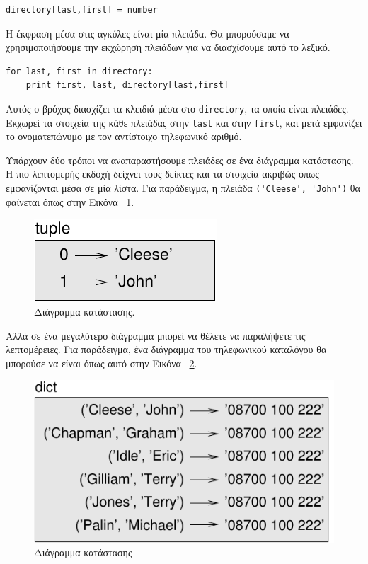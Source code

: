 \documentclass[10pt]{book}
\begin{document}
\begin{verbatim}
directory[last,first] = number
\end{verbatim}
%
 Η έκφραση μέσα στις αγκύλες είναι μία πλειάδα. Θα μπορούσαμε να χρησιμοποιήσουμε την εκχώρηση πλειάδων για να διασχίσουμε αυτό το λεξικό.

 
\begin{verbatim}
for last, first in directory:
    print first, last, directory[last,first]
\end{verbatim}
%
 Αυτός ο βρόχος διασχίζει τα κλειδιά μέσα στο  {\tt directory},  τα οποία είναι πλειάδες. Εκχωρεί τα στοιχεία της κάθε πλειάδας στην  {\tt last}  και στην  {\tt first},  και μετά εμφανίζει το ονοματεπώνυμο με τον αντίστοιχο τηλεφωνικό αριθμό.

Υπάρχουν δύο τρόποι να αναπαραστήσουμε πλειάδες σε ένα διάγραμμα κατάστασης. Η πιο λεπτομερής εκδοχή δείχνει τους δείκτες και τα στοιχεία ακριβώς όπως εμφανίζονται μέσα σε μία λίστα. Για παράδειγμα, η πλειάδα  \verb"('Cleese', 'John')"  θα φαίνεται όπως στην Εικόνα ~\ref{fig.tuple1}.

\begin{figure}
\centerline
{\includegraphics[scale=0.8]{figs/tuple1.pdf}}
 \caption{Διάγραμμα κατάστασης.} 
\label{fig.tuple1}
\end{figure}

 Αλλά σε ένα μεγαλύτερο διάγραμμα μπορεί να θέλετε να παραλήψετε τις λεπτομέρειες. Για παράδειγμα, ένα διάγραμμα του τηλεφωνικού καταλόγου θα μπορούσε να είναι όπως αυτό στην Εικόνα ~\ref{fig.dict2}.

\begin{figure}
\centerline
{\includegraphics[scale=0.8]{figs/dict2.pdf}}
 \caption{Διάγραμμα κατάστασης}
\label{fig.dict2}
\end{figure}
\end{document}

